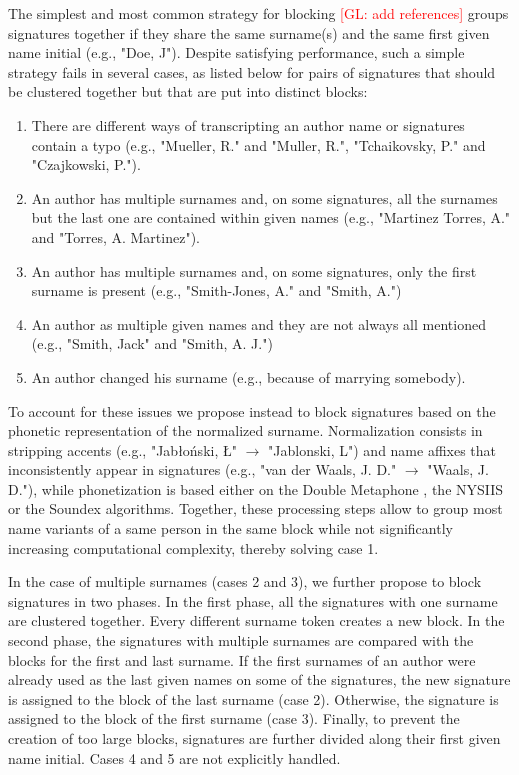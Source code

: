 \documentclass{article}
\newcommand{\glnote}[1]{\textcolor{red}{[GL: #1]}}
\begin{document}
The simplest and most common strategy for blocking \glnote{add references}
groups signatures together if they share the same surname(s) and the same first
given name initial (e.g., "Doe, J"). Despite satisfying performance, such
a simple strategy fails in several cases, as listed below for
pairs of signatures that should be clustered together but that are put into distinct
blocks:

\begin{enumerate}
  \item There are different
  ways of transcripting an author name or signatures contain a typo
  (e.g., "Mueller, R." and "Muller, R.", "Tchaikovsky, P." and "Czajkowski, P.").

  \item An author has multiple surnames and, on some signatures, all the surnames but the
  last one are contained within given names (e.g., "Martinez Torres, A." and "Torres, A.
  Martinez").

  \item An author has multiple surnames and, on some signatures, only the first surname is
  present (e.g., "Smith-Jones, A." and "Smith, A.")

  \item An author as multiple given names and they are not always all mentioned (e.g.,
  "Smith, Jack" and "Smith, A. J.")

  \item An author changed his surname (e.g., because of marrying somebody).
\end{enumerate}

To account for these issues we propose instead to block signatures based on the
phonetic representation of the normalized surname. Normalization consists in
stripping accents (e.g., "Jabłoński, Ł" $\rightarrow$ "Jablonski, L") and name
affixes that inconsistently appear in signatures (e.g., "van der Waals, J. D."
$\rightarrow$ "Waals, J. D."), while phonetization is based either on the
Double Metaphone \citep{doublemetaphone}, the NYSIIS \citep{nysiis} or the
Soundex \citep{Soundex} algorithms. Together, these processing steps allow to
group most name variants of a same person in the same block while not
significantly increasing computational complexity, thereby solving case 1.

In the case of multiple surnames (cases 2 and 3), we further propose to block
signatures in two phases. In the first phase, all the signatures with  one
surname are clustered together. Every different surname token creates a new
block. In the second phase, the signatures  with multiple surnames are compared
with the blocks for the first and last surname.  If the first surnames of an
author were already used as the last given names on some of the signatures, the
new signature is assigned to the block of the last surname (case 2). Otherwise,
the signature is assigned to the block of the first surname (case 3). Finally,
to prevent the creation of too large blocks, signatures are further divided
along their first given name initial.  Cases 4 and 5 are not
explicitly handled.
\end{document}
